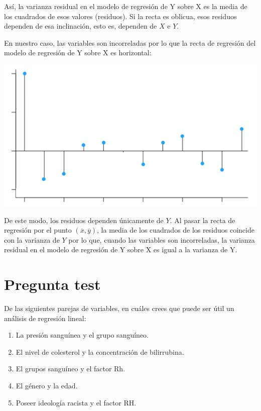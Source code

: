 \documentclass[
]{book}
\providecommand{\tightlist}{%
  \setlength{\itemsep}{0pt}\setlength{\parskip}{0pt}}
\begin{document}
Así, la varianza residual en el modelo de regresión de Y sobre X es la media de los cuadrados de esos valores (residuos). Si la recta es oblicua, esos residuos dependen de esa inclinación, esto es, dependen de \(X\) e \(Y\).

En nuestro caso, las variables son incorreladas por lo que la recta de regresión del modelo de regresión de Y sobre X es horizontal:

\includegraphics[width=15.42in]{img/4_3}

De este modo, los residuos dependen únicamente de \(Y\). Al pasar la recta de regresión por el punto \((\overline{x}, \overline{y})\), la media de los cuadrados de los residuos coincide con la varianza de \(Y\) por lo que, cuando las variables son incorreladas, la varianza residual en el modelo de regresión de Y sobre X es igual a la varianza de Y.

\hypertarget{pregunta-test-126}{%
\section{Pregunta test}\label{pregunta-test-126}}

De las siguientes parejas de variables, en cuáles crees que puede ser útil un análisis de regresión lineal:

\begin{enumerate}
\def\labelenumi{\alph{enumi})}
\tightlist
\item
  La presión sanguínea y el grupo sanguíneo.
\item
  El nivel de colesterol y la concentración de bilirrubina.
\item
  El grupos sanguíneo y el factor Rh.
\item
  El género y la edad.
\item
  Poseer ideología racista y el factor RH.
\end{enumerate}
\end{document}
